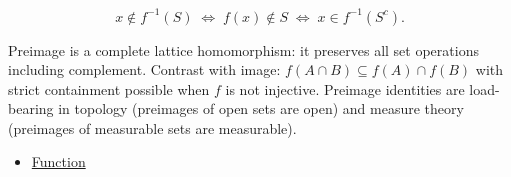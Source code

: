 \begin{remark*}
\[
  x\notin f^{-1}(S)
  \;\iff\; f(x)\notin S
  \;\iff\; x\in f^{-1}(S^c).
\]
\end{remark*}

\begin{remark*}[Interpretation]
Preimage is a complete lattice homomorphism: it preserves all set
operations including complement. Contrast with image: $f(A\cap B)
\subseteq f(A)\cap f(B)$ with strict containment possible when $f$
is not injective. Preimage identities are load-bearing in topology
(preimages of open sets are open) and measure theory (preimages of
measurable sets are measurable).
\end{remark*}

\begin{dependencies}
\begin{itemize}
  \item \hyperref[def:function]{Function}
\end{itemize}
\end{dependencies}
